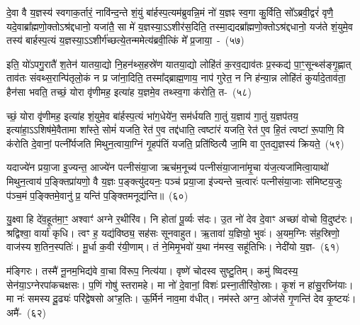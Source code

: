 {\anuvakamend[{श्रि॒तस्ते॒ प्र त्रि॒ष्टुभ॑मे॒तद्द्यावा॑\-पृथि॒वी या अया᳚क्ष्म प्रा॒णाने॒व षट्च॑त्वारिꣳशच्च}]}

दे॒वा वै य॒ज्ञस्य॑ स्वगाक॒र्तारं॒ नावि॑न्द॒न्ते शं॒युं बा॑र्\mbox{}हस्प॒त्य\-म॑ब्रुवन्नि॒मं नो॑ य॒ज्ञꣴ स्व॒गा कु॒र्विति॒ सो᳚\-ऽब्रवी॒द्वरं॑ वृणै॒ यदे॒वा\-ब्रा᳚ह्मणो॒क्तो\-ऽश्र॑द्दधानो॒ यजा॑तै॒ सा मे॑ य॒ज्ञस्या॒\-ऽऽ\-शीर॑स॒दिति॒ तस्मा॒द्यदब्रा᳚ह्मणो॒क्तो\-ऽश्र॑द्दधानो॒ यज॑ते शं॒युमे॒व तस्य॑ बार्\mbox{}हस्प॒त्यं य॒ज्ञस्या॒\-ऽऽ\-शीर्ग॑च्छ\-त्ये॒तन्ममेत्य॑ब्रवी॒त्किं मे᳚ प्र॒जाया॒~-~(५७)\ip

इति॒ यो॑\-ऽपगु॒रातै॑ श॒तेन॑ यातया॒द्यो नि॒हन॑थ्स॒हस्रे॑ण यातया॒द्यो लोहि॑तं क॒रव॒द्याव॑तः प्र॒स्कद्य॑ पा॒ꣳ॒सून्थ्स॑ङ्गृ॒ह्णात् ताव॑तः संवथ्स॒रान्पि॑तृलो॒कं न प्र जा॑ना॒दिति॒ तस्मा᳚द्ब्राह्म॒णाय॒ नाप॑ गुरेत॒ न नि ह॑न्या॒न्न लोहि॑तं कुर्यादे॒ताव॑ता॒ हैन॑सा भवति॒ तच्छं॒ योरा वृ॑णीमह॒ इत्या॑ह य॒ज्ञमे॒व तथ्स्व॒गा क॑रोति॒ त-~(५८)\ip

च्छं॒ योरा वृ॑णीमह॒ इत्या॑ह शं॒युमे॒व बा॑र्\mbox{}हस्प॒त्यं भा॑ग॒धेये॑न॒ सम॑र्धयति गा॒तुं य॒ज्ञाय॑ गा॒तुं य॒ज्ञप॑तय॒ इत्या॑हा॒\-ऽऽ\-शिष॑मे॒वैतामा शा᳚स्ते॒ सोमं॑ यजति॒ रेत॑ ए॒व तद्द॑धाति॒ त्वष्टा॑रं यजति॒ रेत॑ ए॒व हि॒तं त्वष्टा॑ रू॒पाणि॒ वि क॑रोति दे॒वानां॒ पत्नी᳚र्यजति मिथुन॒त्वाया॒ग्निं गृ॒हप॑तिं यजति॒ प्रति॑ष्ठित्यै जा॒मि वा ए॒तद्य॒ज्ञस्य॑ क्रियते॒~(५९)\ip

यदाज्ये॑न प्रया॒जा इ॒ज्यन्त॒ आज्ये॑न पत्नीसंया॒जा ऋच॑म॒नूच्य॑ पत्नीसंया॒जाना॑मृ॒चा य॑ज॒त्यजा॑मित्वा॒याथो॑ मिथुन॒त्वाय॑ प॒ङ्क्तिप्रा॑यणो॒ वै य॒ज्ञः प॒ङ्क्त्यु॑दयनः॒ पञ्च॑ प्रया॒जा इ॑ज्यन्ते च॒त्वारः॑ पत्नीसंया॒जाः स॑मिष्टय॒जुः प॑ञ्च॒मं प॒ङ्क्तिमे॒वानु॑ प्र॒ यन्ति॑ प॒ङ्क्तिमनूद्य॑न्ति॥~(६०)\ip

{\anuvakamend[{प्र॒जायाः᳚ करोति॒ तत्क्रि॑यते॒ त्रय॑स्त्रिꣳशच्च}]}%

यु॒क्ष्वा हि दे॑व॒हूत॑मा॒ꣳ॒ अश्वाꣳ॑ अग्ने र॒थीरि॑व। नि होता॑ पू॒र्व्यः स॑दः। उ॒त नो॑ देव दे॒वाꣳ अच्छा॑ वोचो वि॒दुष्ट॑रः। श्रद्विश्वा॒ वार्या॑ कृधि। त्वꣳ ह॒ यद्य॑विष्ठ्य॒ सह॑सः सूनवाहुत। ऋ॒तावा॑ य॒ज्ञियो॒ भुवः॑। अ॒यम॒ग्निः स॑ह॒स्रिणो॒ वाज॑स्य श॒तिन॒स्पतिः॑। मू॒र्धा क॒वी र॑यी॒णाम्। तं ने॒मिमृ॒भवो॑ य॒था न॑मस्व॒ सहू॑तिभिः। नेदी॑यो य॒ज्ञ-~(६१)\ip

म॑ङ्गिरः। तस्मै॑ नू॒नम॒भिद्य॑वे वा॒चा वि॑रूप॒ नित्य॑या। वृष्णे॑ चोदस्व सुष्टु॒तिम्। कमु॑ ष्विदस्य॒ सेन॑या॒\-ऽग्नेरपा॑कचक्षसः। प॒णिं गोषु॑ स्तरामहे। मा नो॑ दे॒वानां॒ विशः॑ प्रस्ना॒तीरि॑वो॒स्राः। कृ॒शं न हा॑सु॒रघ्नि॑याः। मा नः॑ समस्य दू॒ढ्यः॑ परि॑द्वेषसो अꣳह॒तिः। ऊ॒र्मिर्न नाव॒मा व॑धीत्। नम॑स्ते अग्न॒ ओज॑से गृ॒णन्ति॑ देव कृ॒ष्टयः॑। अमै॑-~(६२)\ip

